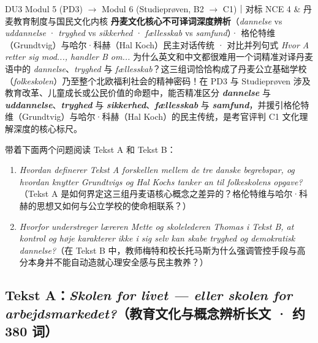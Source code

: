 {DU3 Modul 5 (PD3) $\rightarrow$ Modul 6 (Studieprøven, B2 $\rightarrow$ C1)｜对标 NCE 4 \& 丹麦教育制度与国民文化内核}
{\textbf{丹麦文化核心不可译词深度辨析}（\textit{dannelse} vs \textit{uddannelse} · \textit{tryghed} vs \textit{sikkerhed} · \textit{fællesskab} vs \textit{samfund}）· 格伦特维（Grundtvig）与哈尔·科赫（Hal Koch）民主对话传统 · 对比并列句式 \textit{Hvor A retter sig mod..., handler B om...}}
{为什么英文和中文都很难用一个词精准对译丹麦语中的 \textit{dannelse}、\textit{tryghed} 与 \textit{fællesskab}？这三组词恰恰构成了丹麦公立基础学校（\textit{folkeskolen}）乃至整个北欧福利社会的精神密码！在 PD3 与 Studieprøven 涉及教育改革、儿童成长或公民价值的命题中，能否精准区分 \textbf{\textit{dannelse}} 与 \textbf{\textit{uddannelse}}、\textbf{\textit{tryghed}} 与 \textbf{\textit{sikkerhed}}、\textbf{\textit{fællesskab}} 与 \textbf{\textit{samfund}}，并援引格伦特维（Grundtvig）与哈尔·科赫（Hal Koch）的民主传统，是考官评判 C1 文化理解深度的核心标尺。}

\begin{foerduleaeser}
带着下面两个问题阅读 Tekst A 和 Tekst B：
\begin{enumerate}
  \item \textit{Hvordan definerer Tekst A forskellen mellem de tre danske begrebspar, og hvordan knytter Grundtvigs og Hal Kochs tanker an til folkeskolens opgave?}（Tekst A 是如何界定这三组丹麦语核心概念之差异的？格伦特维与哈尔·科赫的思想又如何与公立学校的使命相联系？）
  \item \textit{Hvorfor understreger læreren Mette og skolelederen Thomas i Tekst B, at kontrol og høje karakterer ikke i sig selv kan skabe tryghed og demokratisk dannelse?}（在 Tekst B 中，教师梅特和校长托马斯为什么强调管控手段与高分本身并不能自动造就心理安全感与民主教养？）
\end{enumerate}
\end{foerduleaeser}


\subsection*{Tekst A：\textit{Skolen for livet --- eller skolen for arbejdsmarkedet?}（教育文化与概念辨析长文 · 约 380 词）}

